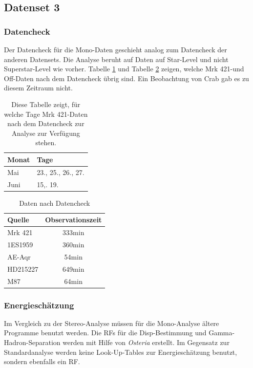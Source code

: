 \FloatBarrier

\subsection{Datenset 3}
\label{subsec:Datenset_3}

\subsubsection{Datencheck}
Der Datencheck für die Mono-Daten geschieht analog zum Datencheck der anderen Datensets.
Die Analyse beruht auf Daten auf Star-Level und nicht Superstar-Level wie vorher.
Tabelle \ref{tab:Datenset3-Mrk421} und Tabelle \ref{tab:Datenset3} zeigen, welche Mrk 421-und Off-Daten nach dem Datencheck übrig sind.
Ein Beobachtung von Crab gab es zu diesem Zeitraum nicht.

\begin{table}[!h]
\centering
\caption{Diese Tabelle zeigt, für welche Tage Mrk 421-Daten nach dem Datencheck zur Analyse zur Verfügung stehen.}
\label{tab:Datenset3-Mrk421}
\begin{tabular}{ll}
  \toprule
  Monat & Tage\\
  \midrule
  \midrule
Mai & 23., 25., 26., 27.\\
Juni & 15,. 19. \\
  \bottomrule
\end{tabular}
\end{table}


\begin{table}[!h]
\centering
\caption{Daten nach Datencheck}
\label{tab:Datenset3}
\begin{tabular}{lc}
  \toprule
  Quelle & Observationszeit\\
  \midrule
  \midrule
  Mrk 421 & 333min\\
  \midrule
  1ES1959 & 360min \\
  AE-Aqr & 54min  \\
  HD215227 & 649min \\
  M87 & 64min \\
  \bottomrule
  \bottomrule
\end{tabular}
\end{table}

\subsubsection{Energieschätzung}
Im Vergleich zu der Stereo-Analyse müssen für die Mono-Analyse ältere Programme benutzt werden.
Die RFs für die Disp-Bestimmung und Gamma-Hadron-Separation werden mit Hilfe von \textit{Osteria} erstellt.
Im Gegensatz zur Standardanalyse werden keine Look-Up-Tables zur Energieschätzung benutzt, sondern ebenfalls ein RF.

